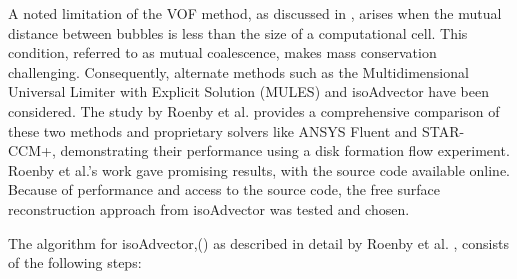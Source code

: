 A noted limitation of the VOF method, as discussed in \cite{hirt1981vof}, arises when the mutual distance between bubbles is less than the size of a computational cell. This condition, referred to as mutual coalescence, makes mass conservation challenging. Consequently, alternate methods such as the Multidimensional Universal Limiter with Explicit Solution (MULES) \cite{zalesak1979fully} and isoAdvector \cite{roenby2019isoadvector} have been considered. The study by Roenby et al. \cite{roenby2019isoadvector} provides a comprehensive comparison of these two methods and proprietary solvers like ANSYS Fluent and STAR-CCM+, demonstrating their performance using a disk formation flow experiment. Roenby et al.'s work \cite{roenby2019isoadvector} gave promising results, with the source code available online. Because of performance and access to the source code, the free surface reconstruction approach from isoAdvector was tested and chosen.

The algorithm for isoAdvector,(\textbf{}) as described in detail by Roenby et al. \cite{roenby2019isoadvector}, consists of the following steps:
 
